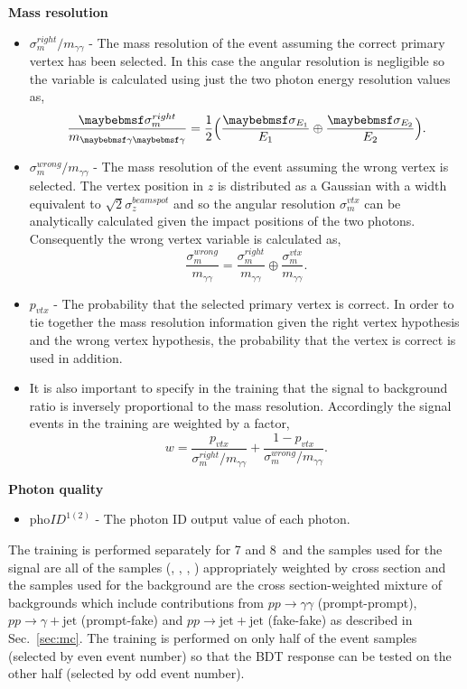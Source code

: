 \noindent\textbf{Mass resolution}
\begin{itemize}
  \item $\sigma_{m}^{right}/m_{\gamma\gamma}$ - The mass resolution of the event assuming the correct primary vertex has been selected. In this case the angular resolution is negligible so the variable is calculated using just the two photon energy resolution values as,
    \begin{equation}
      \frac{\sigma_{m}^{right}}{m_{\gamma\gamma}} = \frac{1}{2}\Bigl(\frac{\sigma_{E_{1}}}{E_{1}} \oplus \frac{\sigma_{E_{2}}}{E_{2}}\Bigr).
    \end{equation}
  \item $\sigma_{m}^{wrong}/m_{\gamma\gamma}$ - The mass resolution of the event assuming the wrong vertex is selected. The vertex position in $z$ is distributed as a Gaussian with a width equivalent to $\sqrt{2}\sigma_{z}^{beamspot}$ and so the angular resolution $\sigma_{m}^{vtx}$ can be analytically calculated given the \ECAL impact positions of the two photons. Consequently the wrong vertex variable is calculated as,
    \begin{equation}
      \frac{\sigma_{m}^{wrong}}{m_{\gamma\gamma}} = \frac{\sigma_{m}^{right}}{m_{\gamma\gamma}} \oplus \frac{\sigma_{m}^{vtx}}{m_{\gamma\gamma}}.
    \end{equation}
  \item $p_{vtx}$ - The probability that the selected primary vertex is correct. In order to tie together the mass resolution information given the right vertex hypothesis and the wrong vertex hypothesis, the probability that the vertex is correct is used in addition.
  \item It is also important to specify in the training that the signal to background ratio is inversely proportional to the mass resolution. Accordingly the signal events in the training are weighted by a factor,
    \begin{equation}
      w = \frac{p_{vtx}}{\sigma_{m}^{right}/m_{\gamma\gamma}} + \frac{1-p_{vtx}}{\sigma_{m}^{wrong}/m_{\gamma\gamma}}.
    \end{equation}
\end{itemize}

\noindent\textbf{Photon quality}
\begin{itemize}
  \item pho$ID^{1(2)}$ - The photon ID \BDT output value of each photon.
\end{itemize}

The training is performed separately for 7 and 8~\TeV and the samples used for the signal are all of the \SM \Hgg \MC samples (\ggH, \VBF, \VH, \ttH) appropriately weighted by cross section and the samples used for the background are the cross section-weighted mixture of \SM backgrounds which include contributions from $pp\rightarrow\gamma\gamma$ (prompt-prompt), $pp\rightarrow\gamma+\mathrm{jet}$ (prompt-fake) and $pp\rightarrow\mathrm{jet+jet}$ (fake-fake) as described in Sec.~\ref{sec:mc}. The training is performed on only half of the event samples (selected by even event number) so that the BDT response can be tested on the other half (selected by odd event number).

